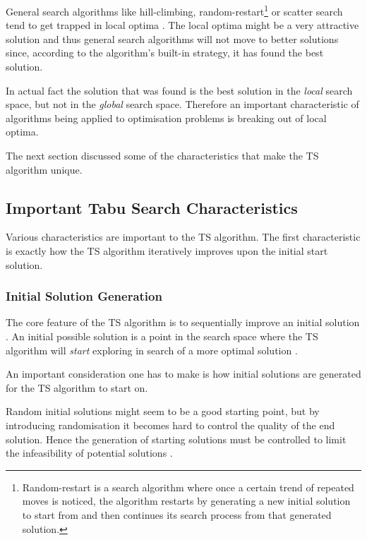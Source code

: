 General search algorithms like hill-climbing, random-restart\footnote{Random-restart is a search algorithm where once a certain trend of repeated moves is noticed, the algorithm restarts by generating a new initial solution to start from and then continues its search process from that generated solution\cite{AIModernApproach}.} or scatter search tend to get trapped in local optima \cite{AIModernApproach}. The local optima might be a very attractive solution and thus general search algorithms will not move to better solutions since, according to the algorithm's built-in strategy, it has found the best solution. 

In actual fact the solution that was found is the best solution in the \emph{local} search space, but not in the \emph{global} search space\cite{CompuIntelligenceIntro,AIModernApproach}. Therefore an important characteristic of algorithms being applied to optimisation problems is breaking out of local optima\cite{CompuIntelligenceIntro,AIModernApproach}.

The next section discussed some of the characteristics that make the \gls{TS} algorithm unique.

\subsection{Important Tabu Search Characteristics}
\label{sec:TScharacteristics}
Various characteristics are important to the \gls{TS} algorithm. The first characteristic is exactly how the \gls{TS} algorithm iteratively improves upon the initial start solution.

\subsubsection{Initial Solution Generation}
The core feature of the \gls{TS} algorithm is to sequentially improve an initial solution \cite{TSHazardous}. An initial possible solution is a point in the search space where the \gls{TS} algorithm will \emph{start} exploring in search of a more optimal solution \cite{AIModernApproach,TSHazardous}.

An important consideration one has to make is how initial solutions are generated for the \gls{TS} algorithm to start on\cite{AIModernApproach,TSHazardous}.

Random initial solutions might seem to be a good starting point, but by introducing randomisation it becomes hard to control the quality of the end solution\cite{TSHazardous}. Hence the generation of starting solutions must be controlled to limit the infeasibility of potential solutions \cite{TSHazardous}. 

